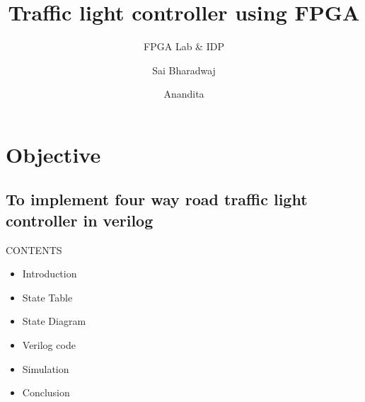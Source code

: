 \documentclass{beamer}
\title{Traffic light controller using FPGA}
\subtitle{FPGA Lab \& IDP}
\author{Sai Bharadwaj\inst{1} \and Anandita\inst{2}}
\institute[] %
{
  \inst{1}%
  Department of Electrical Engineering\\
  EE16BTECH11037
  \and
  \inst{2}%
  Department of Engineering science\\
  ES16BTECH11001}
\begin{document}
\begin{frame}
  \titlepage
\end{frame}



\section{Objective}

\subsection{To implement four way road traffic light controller in verilog}

\begin{frame}{CONTENTS}%
  \begin{itemize}
  \item {
    Introduction 
  }
  \item {
    State Table
  }
  \item {
    State Diagram
  }
  \item {
    Verilog code
  }
  \item {
    Simulation
  }
  \item {
    Conclusion 
  }
  \end{itemize}
\end{frame}

\end{document}
